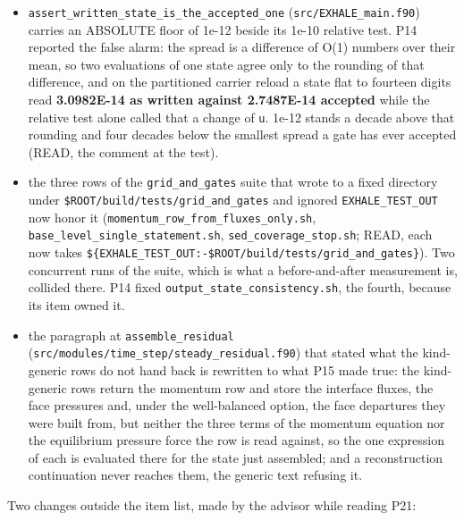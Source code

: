 \documentclass[english,a4paper]{my_memo}
\providecommand{\tightlist}{\setlength{\itemsep}{0pt}\setlength{\parskip}{0pt}}
\begin{document}
\begin{itemize}
\tightlist
\item
  \texttt{assert\_written\_state\_is\_the\_accepted\_one} (\texttt{src/EXHALE\_main.f90}) carries an
  ABSOLUTE floor of 1e-12 beside its 1e-10 relative test. P14 reported the
  false alarm: the spread is a difference of O(1) numbers over their mean, so
  two evaluations of one state agree only to the rounding of that difference,
  and on the partitioned carrier reload a state flat to fourteen digits read
  \textbf{3.0982E-14 as written against 2.7487E-14 accepted} while the relative test
  alone called that a change of \texttt{u}. 1e-12 stands a decade above that rounding
  and four decades below the smallest spread a gate has ever accepted (READ,
  the comment at the test).
\item
  the three rows of the \texttt{grid\_and\_gates} suite that wrote to a fixed directory
  under \texttt{\$ROOT/build/tests/grid\_and\_gates} and ignored \texttt{EXHALE\_TEST\_OUT} now
  honor it (\texttt{momentum\_row\_from\_fluxes\_only.sh},
  \texttt{base\_level\_single\_statement.sh}, \texttt{sed\_coverage\_stop.sh}; READ, each now
  takes \texttt{\$\{EXHALE\_TEST\_OUT:-\$ROOT/build/tests/grid\_and\_gates\}}). Two concurrent
  runs of the suite, which is what a before-and-after measurement is, collided
  there. P14 fixed \texttt{output\_state\_consistency.sh}, the fourth, because its item
  owned it.
\item
  the paragraph at \texttt{assemble\_residual} (\texttt{src/modules/time\_step/steady\_residual.f90})
  that stated what the kind-generic rows do not hand back is rewritten to what P15 made
  true: the kind-generic rows return the momentum row and store the interface
  fluxes, the face pressures and, under the well-balanced option, the face
  departures they were built from, but neither the three terms of the momentum
  equation nor the equilibrium pressure force the row is read against, so the
  one expression of each is evaluated there for the state just assembled; and a
  reconstruction continuation never reaches them, the generic text refusing
  it.
\end{itemize}

Two changes outside the item list, made by the advisor while reading P21:
\end{document}
